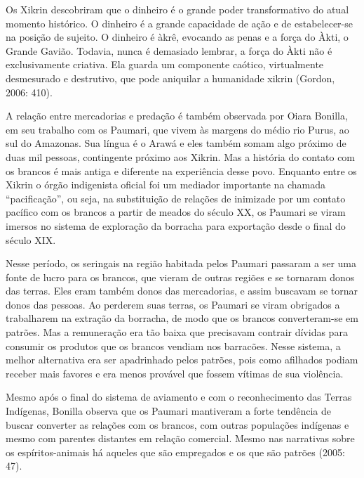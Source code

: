 \documentclass{article}
\begin{document}
Os Xikrin descobriram que o dinheiro \'e o grande poder transformativo
do atual momento hist\'orico. O dinheiro \'e a grande capacidade de
a\c{c}\~ao e de estabelecer-se na posi\c{c}\~ao de sujeito. O dinheiro
\'e \`akr\^e, evocando as penas e a for\c{c}a do \`Akti, o Grande
Gavi\~ao. Todavia, nunca \'e demasiado lembrar, a for\c{c}a do \`Akti
n\~ao \'e exclusivamente criativa. Ela guarda um componente ca\'otico,
virtualmente desmesurado e destrutivo, que pode aniquilar a humanidade
xikrin (Gordon, 2006: 410).

A rela\c{c}\~ao entre mercadorias e preda\c{c}\~ao \'e tamb\'em
observada por Oiara Bonilla, em seu trabalho com os Paumari, que vivem
\`as margens do m\'edio rio Purus, ao sul do Amazonas. Sua l\'ingua \'e
o Araw\'a e eles tamb\'em somam algo pr\'oximo de duas mil pessoas,
contingente pr\'oximo aos Xikrin. Mas a hist\'oria do contato com os
brancos \'e mais antiga e diferente na experi\^encia desse povo.
Enquanto entre os Xikrin o \'org\~ao indigenista oficial foi um
mediador importante na chamada
{\textquotedblleft}pacifica\c{c}\~ao{\textquotedblright}, ou seja, na
substitui\c{c}\~ao de rela\c{c}\~oes de inimizade por um contato
pac\'ifico com os brancos a partir de meados do s\'eculo XX, os Paumari
se viram imersos no sistema de explora\c{c}\~ao da borracha para
exporta\c{c}\~ao desde o final do s\'eculo XIX.

Nesse per\'iodo, os seringais na regi\~ao habitada pelos Paumari
passaram a ser uma fonte de lucro para os brancos, que vieram de outras
regi\~oes e se tornaram donos das terras. Eles eram tamb\'em donos das
mercadorias, e assim buscavam se tornar donos das pessoas. Ao perderem
suas terras, os Paumari se viram obrigados a trabalharem na
extra\c{c}\~ao da borracha, de modo que os brancos converteram-se em
patr\~oes. Mas a remunera\c{c}\~ao era t\~ao baixa que precisavam
contrair d\'ividas para consumir os produtos que os brancos vendiam nos
barrac\~oes. Nesse sistema, a melhor alternativa era ser apadrinhado
pelos patr\~oes, pois como afilhados podiam receber mais favores e era
menos prov\'avel que fossem v\'itimas de sua viol\^encia.

Mesmo ap\'os o final do sistema de aviamento e com o reconhecimento das
Terras Ind\'igenas, Bonilla observa que os Paumari mantiveram a forte
tend\^encia de buscar converter as rela\c{c}\~oes com os brancos, com
outras popula\c{c}\~oes ind\'igenas e mesmo com parentes distantes em
rela\c{c}\~ao comercial. Mesmo nas narrativas sobre os
esp\'iritos-animais h\'a aqueles que s\~ao empregados e os que s\~ao
patr\~oes (2005: 47).
\end{document}
